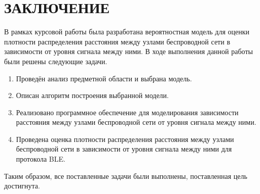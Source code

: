 \part*{ЗАКЛЮЧЕНИЕ}

В рамках курсовой работы была разработана вероятностная модель для оценки плотности распределения расстояния между узлами беспроводной сети в зависимости от уровня сигнала между ними. В ходе выполнения данной работы были решены следующие задачи.
\begin{enumerate}[label*=\arabic*.]
	\item Проведён анализ предметной области и выбрана модель.
	\item Описан алгоритм построения выбранной модели.
	\item Реализовано программное обеспечение для моделирования зависимости расстояния между узлами беспроводной сети от уровня сигнала между ними. 
	\item Проведена оценка плотности распределения расстояния между узлами беспроводной сети в зависимости от уровня сигнала между ними для протокола BLE.
\end{enumerate}

Таким образом, все поставленные задачи были выполнены, поставленная цель достигнута.
